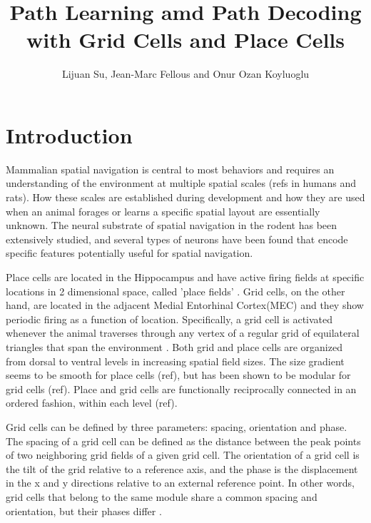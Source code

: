\documentclass[11pt, letterpaper, onecolumn]{article}
\begin{document}
\renewcommand{\refname}{\vspace{-0.25in}}
\setcounter{task}{1}
\newcommand{\task}{Task \#\arabic{task}\addtocounter{task}{1}}


\title{Path Learning amd Path Decoding with Grid Cells and Place Cells}
\author{Lijuan Su, Jean-Marc Fellous and Onur Ozan Koyluoglu}
\maketitle
\abstract{}

\newpage
\setcounter{page}{1}
\section{Introduction}

Mammalian spatial navigation is central to most behaviors and requires an understanding of the environment at multiple spatial scales (refs in humans and rats). How these scales are established during development and how they are used when an animal forages or learns a specific spatial layout are essentially unknown.
The neural substrate of spatial navigation in the rodent has been extensively studied, and several types of neurons have been found that encode specific features potentially useful for spatial navigation.

Place cells are located in the Hippocampus and have active firing fields at specific locations in 2 dimensional space, called 'place fields' \cite{Keefe:hippocampus78}. Grid cells, on the other hand, are located in the adjacent Medial Entorhinal Cortex(MEC) and they show periodic firing as a function of location. Specifically, a grid cell is activated whenever the animal traverses through any vertex of a regular grid of equilateral triangles that span the environment \cite{Hafting:Microstructure05}. Both grid and place cells are organized from dorsal to ventral levels in increasing spatial field sizes. The size gradient seems to be smooth for place cells (ref), but has been shown to be modular for grid cells (ref). Place and grid cells are functionally reciprocally connected in an ordered fashion, within each level (ref).

Grid cells can be defined by three parameters: spacing, orientation and phase. The spacing of a grid cell can be defined as the distance between the peak points of two neighboring grid fields of a given grid cell. The orientation of a grid cell is the tilt of the grid relative to a reference axis, and the phase is the displacement in the x and y directions relative to an external reference point. In other words, grid cells that belong to the same module share a common spacing and orientation, but their phases differ \cite{Hafting:Microstructure05}.
\end{document}
